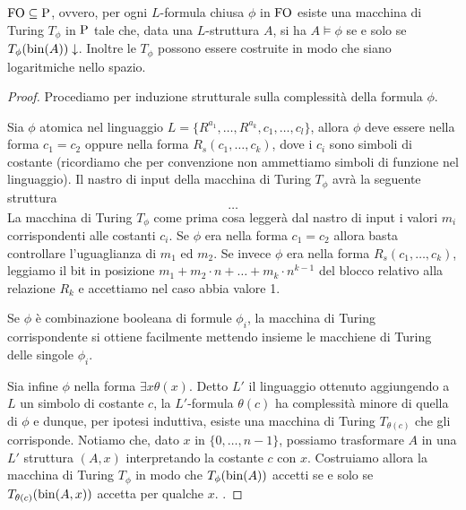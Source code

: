 \begin{lemma}
 $\FO \subseteq \P$, ovvero, per ogni $L$-formula chiusa $\phi$ in $\FO$ esiste
 una macchina di Turing $T_\phi$ in $\P$ tale che, data una $L$-struttura $A$,
 si ha $A \models \phi$ se e solo se $T_\phi(\bin(A))\downarrow$. Inoltre
 le $T_\phi$ possono essere costruite in modo che siano logaritmiche nello spazio.
\end{lemma}
\begin{proof}
 Procediamo per induzione strutturale sulla complessità della formula $\phi$.
 
 Sia $\phi$ atomica nel linguaggio $L=\{ R^{a_1},\ldots,R^{a_k},c_1,\ldots,c_l \}$,
 allora $\phi$ deve essere nella forma $c_1=c_2$ oppure nella forma $R_s(c_1,\ldots, c_k)$,
 dove i $c_i$ sono simboli di costante (ricordiamo che per convenzione
 non ammettiamo simboli di funzione nel linguaggio). Il nastro di input della
 macchina di Turing $T_\phi$ avrà la seguente struttura
 \[ \ldots \]
 La macchina di Turing $T_\phi$ come prima cosa leggerà dal nastro di
 input i valori $m_i$ corrispondenti alle costanti $c_i$.
 Se $\phi$ era nella forma $c_1 = c_2$ allora basta controllare l'uguaglianza
 di $m_1$ ed $m_2$. Se invece $\phi$ era nella forma $R_s(c_1,\ldots,c_k)$,
 leggiamo il bit in posizione $m_1 + m_2 \cdot n + \ldots + m_k \cdot n^{k-1}$
 del blocco relativo alla relazione $R_k$ e accettiamo nel caso abbia valore 1.
 
 Se $\phi$ è combinazione booleana di formule $\phi_i$,
 la macchina di Turing corrispondente si ottiene facilmente mettendo insieme le
 macchiene di Turing delle singole $\phi_i$.
 
 Sia infine $\phi$ nella forma $\exists x \theta(x)$. Detto $L'$ il linguaggio
 ottenuto aggiungendo a $L$ un simbolo di costante $c$,
 la $L'$-formula $\theta(c)$ ha complessità minore di quella di $\phi$
 e dunque, per ipotesi induttiva, esiste una
 macchina di Turing $T_{\theta(c)}$ che gli corrisponde.
 Notiamo che, dato $x$ in $\{0,\ldots, n-1\}$, possiamo trasformare $A$ in una $L'$
 struttura $(A,x)$ interpretando la costante $c$ con $x$.
 Costruiamo allora la macchina di Turing $T_\phi$ in modo che $T_\phi(\bin(A))$
 accetti se e solo se $T_{\theta(c)}(\bin(A,x))$ accetta per qualche $x$.
 .
\end{proof}


